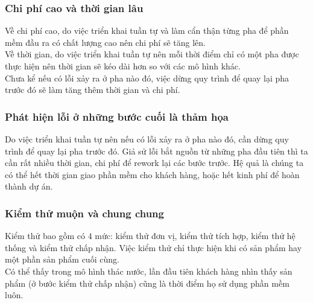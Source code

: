 \documentclass[14pt]{extarticle}
\begin{document}
\subsubsection*{Chi phí cao và thời gian lâu}
Về chi phí cao, do việc triển khai tuần tự và làm cẩn thận từng pha
để phần mềm đầu ra có chất lượng cao nên chi phí sẽ tăng lên.\\


Về thời gian, do việc triển khai tuần tự nên mỗi thời điểm chỉ có một
pha được thực hiện nên thời gian sẽ kéo dài hơn so với các mô hình khác.\\
Chưa kể nếu có lỗi xảy ra ở pha nào đó, việc dừng quy trình để quay lại
pha trước đó sẽ làm tăng thêm thời gian và chi phí.

\subsubsection*{Phát hiện lỗi ở những bước cuối là thảm họa}
Do việc triển khai tuần tự nên nếu có lỗi xảy ra ở pha nào đó, cần
dừng quy trình để quay lại pha trước đó. Giả sử lỗi bắt nguồn từ những pha
đầu tiên thì ta cần rất nhiều thời gian, chi phí để rework lại các bước trước.
Hệ quả là chúng ta có thể hết thời gian giao phần mềm cho khách hàng, hoặc
hết kinh phí để hoàn thành dự án.

\subsubsection*{Kiểm thử muộn và chung chung}
Kiểm thử bao gồm có $4$ mức: kiểm thử đơn vị, kiểm thử tích hợp, kiểm thử
hệ thống và kiểm thử chấp nhận. Việc kiểm thử chỉ thực hiện khi có sản phẩm
hay một phần sản phẩm cuối cùng.\\

Có thể thấy trong mô hình thác nước, lần đầu tiên khách hàng nhìn thấy sản phẩm
(ở bước kiểm thử chấp nhận) cũng là thời điểm họ sử dụng phần mềm luôn.\\
\end{document}
